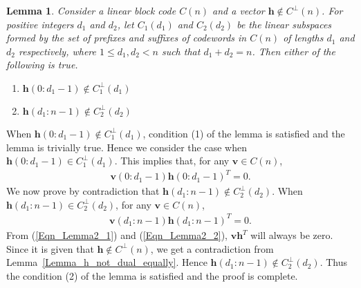 \documentclass[10pt,journal]{IEEEtran}
\newtheorem{lemma}{Lemma}
\begin{document}
% 
\begin{lemma}
% 
\label{Lemma_for_sync_equally_likely}
% 
Consider a linear block code $C(n)$ and a vector $\mathbf{h} \notin C^{\perp}(n)$.
For positive integers $d_1$ and $d_2$, let $C_1(d_1)$ and $C_2(d_2)$ be the linear subspaces formed by the
set of prefixes and suffixes of codewords in $C(n)$ of lengths $d_1$ and $d_2$ respectively, where $1 \leq d_1, d_2 < n$
such that $d_1+d_2=n$.
Then either of the following is true. 
% 
\begin{enumerate}[(1)]
%  
\item $\mathbf{h}(0:d_1-1) \notin C_1^{\perp}(d_1)$
% 
\item $\mathbf{h}(d_1:n-1) \notin C_2^{\perp}(d_2)$
% 
\end{enumerate}

%  
\end{lemma}

\begin{IEEEproof}
% 
When $\mathbf{h}(0:d_1-1) \notin C_1^{\perp}(d_1)$, 
condition (1) of the lemma is satisfied and the lemma is trivially true.
% 
Hence we consider the case when $\mathbf{h}(0:d_1-1) \in C_1^{\perp}(d_1)$.
This implies that, for any $\mathbf{v} \in C(n)$, 
% 
\begin{align}
%  
\mathbf{v}(0:d_1-1)\mathbf{h}(0:d_1-1)^{T} = 0.
\label{Eqn_Lemma2_1}
% 
\end{align}
% 
We now prove by contradiction that $\mathbf{h}(d_1:n-1) \notin C_2^{\perp}(d_2)$.
When $\mathbf{h}(d_1:n-1) \in C_2^{\perp}(d_2)$, for any $\mathbf{v} \in C(n)$,
% 
\begin{align}
%  
\mathbf{v}(d_1:n-1) \mathbf{h}(d_1:n-1)^{T} = 0.
\label{Eqn_Lemma2_2}
% 
\end{align}
% 
From (\ref{Eqn_Lemma2_1}) and (\ref{Eqn_Lemma2_2}), $\mathbf{v} \mathbf{h}^{T} $ will always be zero.
Since it is given that $\mathbf{h} \notin C^{\perp}(n)$,
we get a contradiction from Lemma~\ref{Lemma_h_not_dual_equally}.
Hence $\mathbf{h}(d_1:n-1) \notin C_2^{\perp}(d_2)$. 
Thus the condition (2) of the lemma is satisfied and the proof is complete.
% 
\end{IEEEproof}
\end{document}
